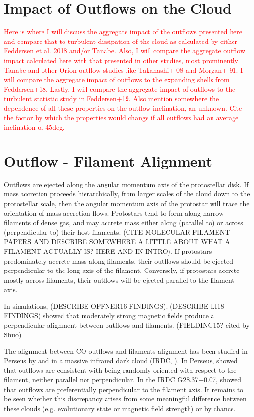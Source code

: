 \documentclass[twocolumn]{aastex62}
\begin{document}
\section{Impact of Outflows on the Cloud}
\textcolor{red}{Here is where I will discuss the aggregate impact of the outflows presented here and compare that to turbulent dissipation of the cloud as calculated by either Feddersen et al. 2018 and/or Tanabe. Also, I will compare the aggregate outflow impact calculated here with that presented in other studies, most prominently Tanabe and other Orion outflow studies like Takahashi+ 08 and Morgan+ 91. I will compare the aggregate impact of outflows to the expanding shells from Feddersen+18. Lastly, I will compare the aggregate impact of outflows to the turbulent statistic study in Feddersen+19. Also mention somewhere the dependence of all these properties on the outflow inclination, an unknown. Cite the factor by which the properties would change if all outflows had an average inclination of 45deg.}

\section{Outflow - Filament Alignment}
Outflows are ejected along the angular momentum axis of the protostellar disk. If mass accretion proceeds hierarchically, from larger scales of the cloud down to the protostellar scale, then the angular momentum axis of the protostar will trace the orientation of mass accretion flows. Protostars tend to form along narrow filaments of dense gas, and may accrete mass either along (parallel to) or across (perpendicular to) their host filaments. (CITE MOLECULAR FILAMENT PAPERS AND DESCRIBE SOMEWHERE A LITTLE ABOUT WHAT A FILAMENT ACTUALLY IS? HERE AND IN INTRO). If protostars predominately accrete mass along filaments, their outflows should be ejected perpendicular to the long axis of the filament. Conversely, if protostars accrete mostly across filaments, their outflows will be ejected parallel to the filament axis. 


In simulations, \citet{Offner16} (DESCRIBE OFFNER16 FINDINGS). \citet{Li18} (DESCRIBE LI18 FINDINGS) showed that moderately strong magnetic fields produce a perpendicular alignment between outflows and filaments.  (FIELDING15? cited by Shuo)

The alignment between CO outflows  and filaments alignment has been studied in Perseus by \citet{Stephens17} and in a massive infrared dark cloud (IRDC, \citealp{Kong19}). In Perseus, \citet{Stephens17} showed that outflows are consistent with being randomly oriented with respect to the filament, neither parallel nor perpendicular. In the IRDC G28.37+0.07, \cite{Kong19} showed that outflows are preferentially perpendicular to the filament axis. It remains to be seen whether this discrepancy arises from some meaningful difference between these clouds (e.g. evolutionary state or magnetic field strength) or by chance. 
\end{document}
